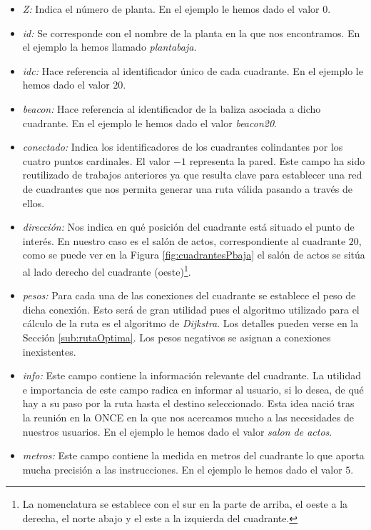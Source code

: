 \begin{itemize}
	\item \textit{Z:} Indica el número de planta. En el ejemplo le hemos dado el valor $0$.
	
	\item \textit{id:} Se corresponde con el nombre de la planta en la que nos encontramos. En el ejemplo la hemos llamado \textit{plantabaja}.
	
	\item \textit{idc:} Hace referencia al identificador único de cada cuadrante. En el ejemplo le hemos dado el valor $20$.
	
	\item \textit{beacon:} Hace referencia al identificador de la baliza asociada a dicho cuadrante. En el ejemplo le hemos dado el valor \textit{beacon20}.
	
	\item \textit{conectado:} Indica los identificadores de los cuadrantes colindantes por los cuatro puntos cardinales. El valor $-1$ representa la pared. Este campo ha sido reutilizado de trabajos anteriores ya que resulta clave para establecer una red de cuadrantes que nos permita generar una ruta válida pasando a través de ellos.
	
	\item \textit{dirección:} Nos indica en qué posición del cuadrante está situado el punto de interés. En nuestro caso es el salón de actos, correspondiente al cuadrante $20$, como se puede ver en la Figura \ref{fig:cuadrantesPbaja} el salón de actos se sitúa al lado derecho del cuadrante (oeste)\footnote{La nomenclatura se establece con el sur en la parte de arriba, el oeste a la derecha, el norte abajo y el este a la izquierda del cuadrante.}.
	
	\item \textit{pesos:} Para cada una de las conexiones del cuadrante se establece el peso de dicha conexión. Esto será de gran utilidad pues el algoritmo utilizado para el cálculo de la ruta es el algoritmo de \textit{Dijkstra}. Los detalles pueden verse en la Sección \ref{sub:rutaOptima}. Los pesos negativos se asignan a conexiones inexistentes.
	
	\item \textit{info:} Este campo contiene la información relevante del cuadrante. La utilidad e importancia de este campo radica en informar al usuario, si lo desea, de qué hay a su paso por la ruta hasta el destino seleccionado. Esta idea nació tras la reunión en la ONCE en la que nos acercamos mucho a las necesidades de nuestros usuarios. En el ejemplo le hemos dado el valor \textit{salon de actos}.
	
	\item \textit{metros:} Este campo contiene la medida en metros del cuadrante lo que aporta mucha precisión a las instrucciones. En el ejemplo le hemos dado el valor $5$.
\end{itemize}

